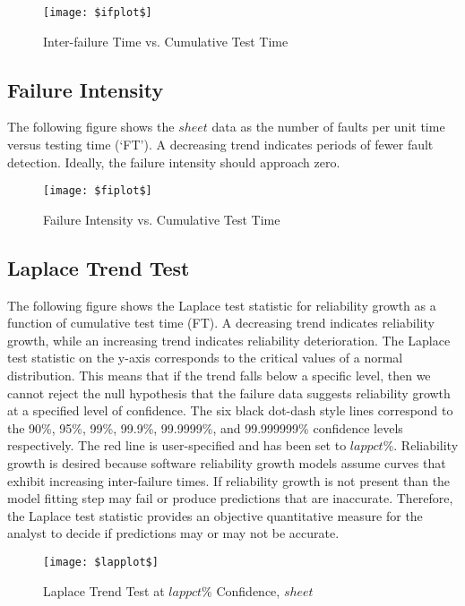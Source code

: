 \documentclass{article}
\begin{document}
\begin{figure}[h!]
\centering
\texttt{[image: \$ifplot\$]}
\caption{Inter-failure Time vs. Cumulative Test Time}
\label{fig:ifplot}
\end{figure}



\newpage
\subsection{Failure Intensity}
The following figure shows the $sheet$ data as the number of faults per unit time versus testing time (`FT'). A decreasing trend indicates periods of fewer fault detection. Ideally, the failure intensity should approach zero.

\begin{figure}[h!]
\centering
\texttt{[image: \$fiplot\$]}
\caption{Failure Intensity vs. Cumulative Test Time}
\label{fig:fiplot}
\end{figure}



\newpage
\subsection{Laplace Trend Test}
The following figure shows the Laplace test statistic for reliability growth as a function of cumulative test time (FT). A decreasing trend indicates reliability growth, while an increasing trend indicates reliability deterioration. The Laplace test statistic on the y-axis corresponds to the critical values of a normal distribution. This means that if the trend falls below a specific level, then we cannot reject the null hypothesis that the failure data suggests reliability growth at a specified level of confidence. The six black dot-dash style
lines correspond to the 90\%, 95\%, 99\%, 99.9\%, 99.9999\%, and 99.999999\% confidence levels respectively. The red line is user-specified and has been set to $lappct$\%. Reliability growth is desired because software reliability growth models assume curves that exhibit increasing inter-failure times. If reliability growth is not present than the model fitting step may fail or produce predictions that are inaccurate. Therefore, the Laplace test statistic provides an objective quantitative measure for the analyst to decide if predictions may or may not be accurate.


\begin{figure}[h!]
\centering
\texttt{[image: \$lapplot\$]}
\caption{Laplace Trend Test at $lappct$\% Confidence, $sheet$}
\label{fig:lapplot}
\end{figure}
\end{document}
